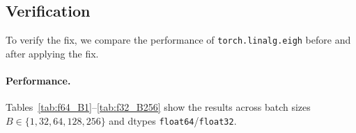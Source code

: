 \documentclass[10pt, letterpaper]{article}
\begin{document}
\subsection{Verification}

To verify the fix, we compare the performance of \texttt{torch.linalg.eigh} before and after applying the fix.

\paragraph{Performance.}
Tables~\ref{tab:f64_B1}--\ref{tab:f32_B256} show the results across
batch sizes $B \in \{1, 32, 64, 128, 256\}$ and dtypes
\texttt{float64}/\texttt{float32}.

\end{document}

